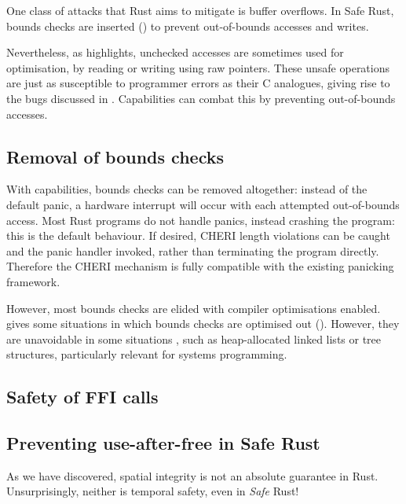 \documentclass[dissertation.tex]{subfiles}
\begin{document}
One class of attacks that Rust aims to mitigate is buffer overflows.
In Safe Rust, bounds checks are inserted ()
to prevent out-of-bounds accesses and writes.

Nevertheless, as  highlights, unchecked accesses
are sometimes used for optimisation, by reading or writing using raw
pointers.
These unsafe operations are just as susceptible to programmer errors as
their C analogues, giving rise to the bugs discussed in
.
Capabilities can combat this by preventing out-of-bounds accesses.


\subsection{Removal of bounds checks}
\label{sec:eval-rust-bounds}

With capabilities, bounds checks can be removed altogether: instead of
the default panic, a hardware interrupt will occur with each attempted
out-of-bounds access.
Most Rust programs do not handle panics, instead crashing the program:
this is the default behaviour.
If desired, CHERI length violations can be caught and the panic handler
invoked, rather than terminating the program directly.
Therefore the CHERI mechanism is fully compatible with the existing
panicking framework.

However, most bounds checks are elided with compiler optimisations
enabled.
 gives some situations in which bounds checks are
optimised out ().
However, they are unavoidable in some situations , such as
heap-allocated linked lists or tree structures, particularly relevant
for systems programming.


\subsection{Safety of FFI calls}
\label{sec:eval-rust-xprocess}



\subsection{Preventing use-after-free in Safe Rust}
\label{sec:eval-rust-use-after-free}

As we have discovered, spatial integrity is not an absolute guarantee in
Rust.
Unsurprisingly, neither is temporal safety, even in \emph{Safe} Rust!
\end{document}

